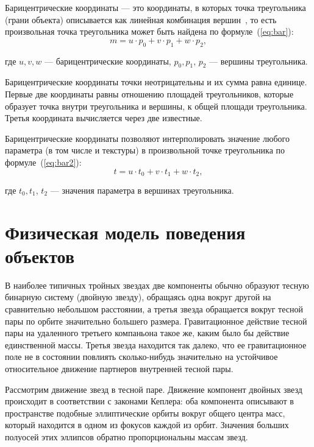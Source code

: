 Барицентрические координаты --- это координаты, в которых точка треугольника (грани объекта) описывается как линейная комбинация вершин~\cite{rojers}, то есть произвольная точка треугольника может быть найдена по формуле~(\ref{eq:bar}):
    \begin{equation}\label{eq:bar}
	    m = u \cdot p_{0} + v \cdot p_{1} + w \cdot p_{2},
    \end{equation}

\noindent где $u, v, w$ --- барицентрические координаты, $p_{0}, p_{1}$, $p_{2}$ --- вершины треугольника.

Барицентрические координаты точки неотрицательны и их сумма равна единице.  Первые две координаты равны отношению площадей треугольников, которые
образует точка внутри треугольника и вершины, к общей площади треугольника.
Третья координата вычисляется через две известные.

Барицентрические координаты позволяют интерполировать значение
любого параметра (в том числе и текстуры) в произвольной точке треугольника по формуле~(\ref{eq:bar2}):
    \begin{equation}\label{eq:bar2}
	    t = u \cdot t_{0} + v \cdot t_{1} + w \cdot t_{2},
    \end{equation}

\noindent где $t_{0}, t_{1}$, $t_{2}$ --- значения параметра в вершинах треугольника. 


\section{Физическая модель поведения объектов}

 В наиболее типичных тройных звездах две компоненты обычно образуют тесную бинарную систему (двойную звезду), обращаясь одна вокруг другой на сравнительно небольшом расстоянии, а третья звезда обращается вокруг тесной пары по орбите значительно большего размера. Гравитационное действие тесной пары на удаленного третьего компаньона такое же, каким было бы действие единственной массы. Третья звезда находится так далеко, что ее гравитационное поле не в состоянии повлиять сколько-нибудь значительно на устойчивое относительное движение партнеров внутренней тесной пары.

 Рассмотрим движение звезд в тесной паре. Движение компонент двойных звезд происходит в соответствии с законами Кеплера: оба компонента описывают в пространстве подобные эллиптические орбиты вокруг общего центра масс, который находится в одном из фокусов каждой из орбит. Значения больших полуосей этих эллипсов обратно пропорциональны массам звезд.


